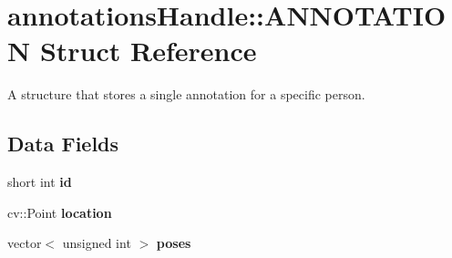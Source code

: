 \hypertarget{structannotationsHandle_1_1ANNOTATION}{
\section{annotationsHandle::ANNOTATION Struct Reference}
\label{structannotationsHandle_1_1ANNOTATION}
}


A structure that stores a single annotation for a specific person.  


\subsection*{Data Fields}
\begin{DoxyCompactItemize}
\item 
\hypertarget{structannotationsHandle_1_1ANNOTATION_a4ddebd766a76758ce4466a465aeed90b}{
short int {\bfseries id}}
\label{structannotationsHandle_1_1ANNOTATION_a4ddebd766a76758ce4466a465aeed90b}

\item 
\hypertarget{structannotationsHandle_1_1ANNOTATION_aaba89cd13e82e5dca7e8dd511471a1a3}{
cv::Point {\bfseries location}}
\label{structannotationsHandle_1_1ANNOTATION_aaba89cd13e82e5dca7e8dd511471a1a3}

\item 
\hypertarget{structannotationsHandle_1_1ANNOTATION_ae9f38c008635e98afd7fd8ffa8377d92}{
vector$<$ unsigned int $>$ {\bfseries poses}}
\label{structannotationsHandle_1_1ANNOTATION_ae9f38c008635e98afd7fd8ffa8377d92}

\end{DoxyCompactItemize}
